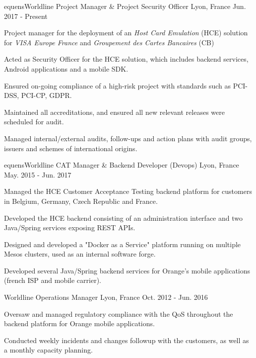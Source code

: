 \begin{cventries}
  \cventry
    {equensWorldline}
    {Project Manager \& Project Security Officer}
    {Lyon, France}
    {Jun. 2017 - Present}
    {
      \begin{cvitems}
        \item {Project manager for the deployment of an \textit{Host Card Emulation} (HCE) solution for \textit{VISA Europe France} and \textit{Groupement des Cartes Bancaires} (CB)}
        \item {Acted as Security Officer for the HCE solution, which includes backend services, Android applications and a mobile SDK.}
        \item {Ensured on-going compliance of a high-risk project with standards such as PCI-DSS, PCI-CP, GDPR.}
        \item {Maintained all accreditations, and ensured all new relevant releases were scheduled for audit.}
        \item {Managed internal/external audits, follow-ups and action plans with audit groups, issuers and schemes of international origins.}
      \end{cvitems}
    }
  \cventry
    {equensWorldline}
    {CAT Manager \& Backend Developer (Devops)}
    {Lyon, France}
    {May. 2015 - Jun. 2017}
    {
      \begin{cvitems}
        \item {Managed the HCE Customer Acceptance Testing backend platform for customers in Belgium, Germany, Czech Republic and France.}
        \item {Developed the HCE backend consisting of an administration interface and two Java/Spring services exposing REST APIs.}
        \item {Designed and developed a "Docker as a Service" platform running on multiple Mesos clusters, used as an internal software forge.}
        \item {Developed several Java/Spring backend services for Orange's mobile applications (french ISP and mobile carrier).}
      \end{cvitems}
    }
  \cventry
    {Worldline}
    {Operations Manager}
    {Lyon, France}
    {Oct. 2012 - Jun. 2016}
    {
      \begin{cvitems}
        \item {Oversaw and managed regulatory compliance with the QoS throughout the backend platform for Orange mobile applications.}
        \item {Conducted weekly incidents and changes followup with the customers, as well as a monthly capacity planning.}

\end{cvitems}}
\end{cventries}

